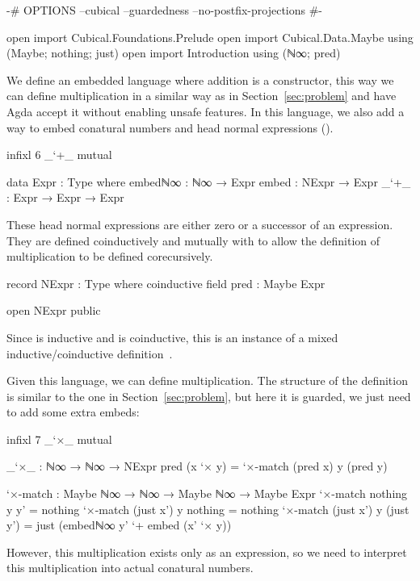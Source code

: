 \begin{code}[hide]
{-# OPTIONS --cubical --guardedness --no-postfix-projections #-}

open import Cubical.Foundations.Prelude
open import Cubical.Data.Maybe using (Maybe; nothing; just)
open import Introduction using (ℕ∞; pred)
\end{code}
We define an embedded language where addition is a constructor, this way we can
define multiplication in a similar way as in Section~\ref{sec:problem} and have
Agda accept it without enabling unsafe features. In this language, we also add a
way to embed conatural numbers and head normal expressions ().
\begin{code}[hide]
infixl 6 _`+_
mutual
\end{code}
\begin{code}
  data Expr : Type where
    embedℕ∞  : ℕ∞ → Expr
    embed    : NExpr → Expr
    _`+_     : Expr → Expr → Expr
\end{code}
These head normal expressions are either zero or a successor of an expression.
They are defined coinductively and mutually with  to allow
the definition of multiplication to be defined corecursively.
\begin{code}
  record NExpr : Type where
    coinductive
    field
      pred : Maybe Expr
\end{code}
\begin{code}[hide]
open NExpr public
\end{code}
Since  is inductive and  is coinductive,
this is an instance of a mixed inductive\slash coinductive
definition~\cite{ghani-stream}.

Given this language, we can define multiplication. The structure of
the definition is similar to the one in Section~\ref{sec:problem}, but here it
is guarded, we just need to add some extra embeds:
\begin{code}[hide]
infixl 7 _`×_
mutual
\end{code}
\begin{code}
  _`×_ : ℕ∞ → ℕ∞ → NExpr
  pred (x `× y) = `×-match (pred x) y (pred y)

  `×-match :
    Maybe ℕ∞ → ℕ∞ → Maybe ℕ∞ → Maybe Expr
  `×-match nothing    y y'         = nothing
  `×-match (just x')  y nothing    = nothing
  `×-match (just x')  y (just y')  =
    just (embedℕ∞ y' `+ embed (x' `× y))
\end{code}
However, this multiplication exists only as an expression, so we need to
interpret this multiplication into actual conatural numbers.

